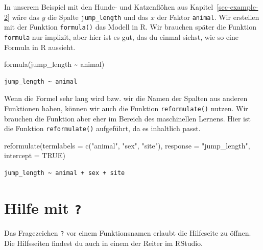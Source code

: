 \documentclass[
  letterpaper,
]{scrbook}
\newenvironment{Shaded}{\begin{snugshade}}{\end{snugshade}}
\newcommand{\AttributeTok}[1]{\textcolor[rgb]{0.40,0.45,0.13}{#1}}
\newcommand{\ConstantTok}[1]{\textcolor[rgb]{0.56,0.35,0.01}{#1}}
\newcommand{\FunctionTok}[1]{\textcolor[rgb]{0.28,0.35,0.67}{#1}}
\newcommand{\NormalTok}[1]{\textcolor[rgb]{0.00,0.23,0.31}{#1}}
\newcommand{\SpecialCharTok}[1]{\textcolor[rgb]{0.37,0.37,0.37}{#1}}
\newcommand{\StringTok}[1]{\textcolor[rgb]{0.13,0.47,0.30}{#1}}
\begin{document}
In unserem Beispiel mit den Hunde- und Katzenflöhen aus
Kapitel~\ref{sec-example-2} wäre das \(y\) die Spalte
\texttt{jump\_length} und das \(x\) der Faktor \texttt{animal}. Wir
erstellen mit der Funktion \texttt{formula()} das Modell in R. Wir
brauchen später die Funktion \texttt{formula} nur implizit, aber hier
ist es gut, das du einmal siehst, wie so eine Formula in R aussieht.

\begin{Shaded}
\begin{Highlighting}[]
\FunctionTok{formula}\NormalTok{(jump\_length }\SpecialCharTok{\textasciitilde{}}\NormalTok{ animal)}
\end{Highlighting}
\end{Shaded}

\begin{verbatim}
jump_length ~ animal
\end{verbatim}

Wenn die Formel sehr lang wird bzw. wir die Namen der Spalten aus
anderen Funktionen haben, können wir auch die Funktion
\texttt{reformulate()} nutzen. Wir brauchen die Funktion aber eher im
Bereich des maschinellen Lernens. Hier ist die Funktion
\texttt{reformulate()} aufgeführt, da es inhaltlich passt.

\begin{Shaded}
\begin{Highlighting}[]
\FunctionTok{reformulate}\NormalTok{(}\AttributeTok{termlabels =} \FunctionTok{c}\NormalTok{(}\StringTok{"animal"}\NormalTok{, }\StringTok{"sex"}\NormalTok{, }\StringTok{"site"}\NormalTok{),}
            \AttributeTok{response =} \StringTok{"jump\_length"}\NormalTok{,}
            \AttributeTok{intercept =} \ConstantTok{TRUE}\NormalTok{)}
\end{Highlighting}
\end{Shaded}

\begin{verbatim}
jump_length ~ animal + sex + site
\end{verbatim}

\hypertarget{sec-R-help}{%
\section{\texorpdfstring{Hilfe mit
\texttt{?}}{Hilfe mit ?}}\label{sec-R-help}}

Das Fragezeichen \texttt{?} vor einem Funktionsnamen erlaubt die
Hilfeseite zu öffnen. Die Hilfsseiten findest du auch in einem der
Reiter im RStudio.
\end{document}
